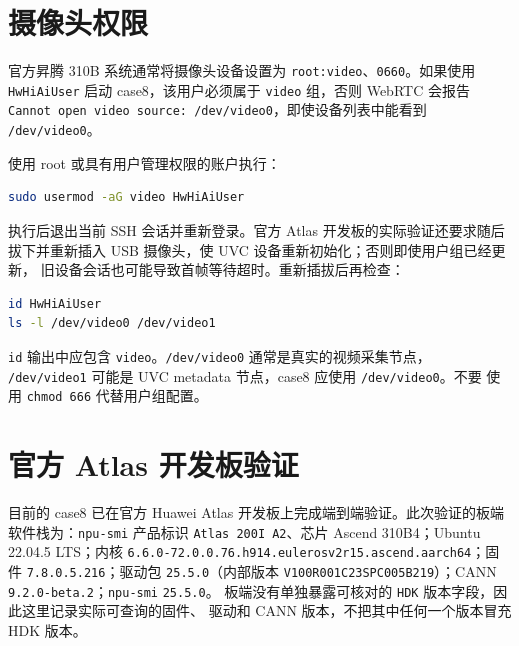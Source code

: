\section{摄像头权限}\label{ux6444ux50cfux5934ux6743ux9650}

官方昇腾 310B 系统通常将摄像头设备设置为
\passthrough{\lstinline!root:video!}、\passthrough{\lstinline!0660!}。如果使用
\passthrough{\lstinline!HwHiAiUser!} 启动 case8，该用户必须属于
\passthrough{\lstinline!video!} 组，否则 WebRTC 会报告
\passthrough{\lstinline!Cannot open video source: /dev/video0!}，即使设备列表中能看到
\passthrough{\lstinline!/dev/video0!}。

使用 root 或具有用户管理权限的账户执行：

\begin{lstlisting}[language=bash]
sudo usermod -aG video HwHiAiUser
\end{lstlisting}

执行后退出当前 SSH 会话并重新登录。官方 Atlas 开发板的实际验证还要求随后
拔下并重新插入 USB 摄像头，使 UVC
设备重新初始化；否则即使用户组已经更新，
旧设备会话也可能导致首帧等待超时。重新插拔后再检查：

\begin{lstlisting}[language=bash]
id HwHiAiUser
ls -l /dev/video0 /dev/video1
\end{lstlisting}

\passthrough{\lstinline!id!} 输出中应包含
\passthrough{\lstinline!video!}。\passthrough{\lstinline!/dev/video0!}
通常是真实的视频采集节点， \passthrough{\lstinline!/dev/video1!} 可能是
UVC metadata 节点，case8 应使用
\passthrough{\lstinline!/dev/video0!}。不要 使用
\passthrough{\lstinline!chmod 666!} 代替用户组配置。

\section{官方 Atlas
开发板验证}\label{ux5b98ux65b9-atlas-ux5f00ux53d1ux677fux9a8cux8bc1}

目前的 case8 已在官方 Huawei Atlas
开发板上完成端到端验证。此次验证的板端
软件栈为：\passthrough{\lstinline!npu-smi!} 产品标识
\passthrough{\lstinline!Atlas 200I A2!}、芯片 Ascend 310B4；Ubuntu
22.04.5 LTS；内核
\passthrough{\lstinline!6.6.0-72.0.0.76.h914.eulerosv2r15.ascend.aarch64!}；固件
\passthrough{\lstinline!7.8.0.5.216!}；驱动包
\passthrough{\lstinline!25.5.0!}（内部版本
\passthrough{\lstinline!V100R001C23SPC005B219!}）；CANN
\passthrough{\lstinline!9.2.0-beta.2!}；\passthrough{\lstinline!npu-smi!}
\passthrough{\lstinline!25.5.0!}。 板端没有单独暴露可核对的
\passthrough{\lstinline!HDK!} 版本字段，因此这里记录实际可查询的固件、
驱动和 CANN 版本，不把其中任何一个版本冒充 HDK 版本。

